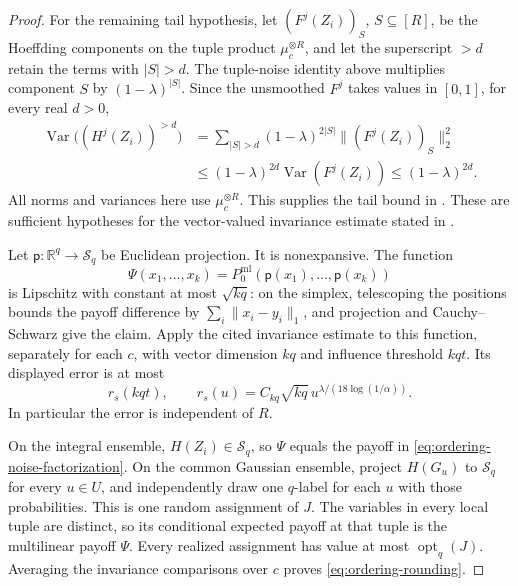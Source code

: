 \begin{proof}
For the remaining tail hypothesis, let \((F^j(Z_i))_S\),
\(S\subseteq[R]\), be the Hoeffding components on the tuple product
\(\mu_c^{\otimes R}\), and let the superscript \(>d\) retain the terms
with \(|S|>d\). The tuple-noise identity above multiplies component
\(S\) by \((1-\lambda)^{|S|}\). Since the unsmoothed \(F^j\) takes
values in \([0,1]\), for every real \(d>0\),
\[
\begin{aligned}
 \operatorname{Var}\bigl((H^j(Z_i))^{>d}\bigr)
 &=\sum_{|S|>d}(1-\lambda)^{2|S|}
       \bigl\|(F^j(Z_i))_S\bigr\|_2^2\\
 &\le (1-\lambda)^{2d}\operatorname{Var}(F^j(Z_i))
 \le (1-\lambda)^{2d}.
\end{aligned}
\]
All norms and variances here use \(\mu_c^{\otimes R}\). This supplies
the tail bound in \cite[Theorem~3.6]{IsakssonMossel2009}.
These are sufficient hypotheses for the vector-valued
invariance estimate stated in
\cite[Theorem~10.1]{GuruswamiEtAl2011OrderingCSP}.

Let \(\mathsf p:\mathbb R^q\to\mathcal S_q\) be Euclidean projection.
It is nonexpansive.  The function
\[
 \Psi(x_1,\ldots,x_k)=
 P_0^{\mathrm{ml}}(\mathsf p(x_1),\ldots,\mathsf p(x_k))
\]
is Lipschitz with constant at most \(\sqrt{kq}\): on the simplex,
telescoping the positions bounds the payoff difference by
\(\sum_i\|x_i-y_i\|_1\), and projection and Cauchy--Schwarz give the
claim.  Apply the cited invariance estimate to this function, separately
for each \(c\), with vector dimension \(kq\) and influence threshold
\(kqt\).  Its displayed error is at most
\[
 r_s(kqt),\qquad
 r_s(u)=C_{kq}\sqrt{kq}\,
             u^{\lambda/(18\log(1/\alpha))}.
\]
In particular the error is independent of \(R\).

On the integral ensemble, \(H(Z_i)\in\mathcal S_q\), so \(\Psi\)
equals the payoff in \eqref{eq:ordering-noise-factorization}.
On the common Gaussian ensemble, project \(H(G_u)\) to
\(\mathcal S_q\) for every \(u\in U\), and independently draw one
\(q\)-label for each \(u\) with those probabilities.  This is one
random assignment of \(J\).  The variables in every local tuple are
distinct, so its conditional expected payoff at that tuple is the
multilinear payoff \(\Psi\).  Every realized assignment has value at
most \(\operatorname{opt}_q(J)\).  Averaging the invariance comparisons
over \(c\) proves \eqref{eq:ordering-rounding}.
\end{proof}

